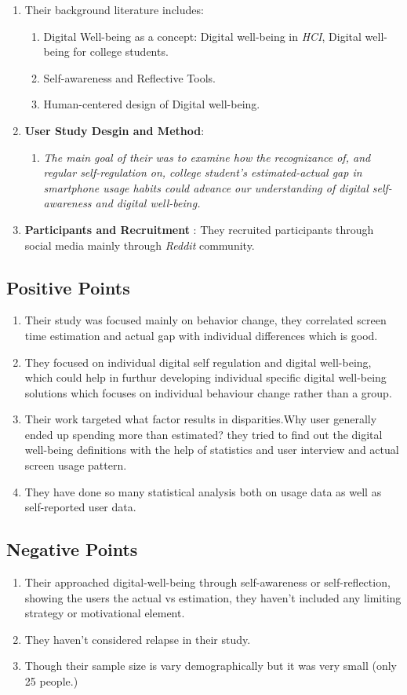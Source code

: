 \documentclass[12pt]{article}
\begin{document}
\begin{enumerate}
    \item Their background literature includes: 
    \begin{enumerate}
        \item Digital Well-being as a concept: Digital well-being in \textit{HCI}, Digital well-being for college students.
        \item Self-awareness and Reflective Tools.
        \item Human-centered design of Digital well-being.
    \end{enumerate}
    \item \textbf{User Study Desgin and Method}:
    \begin{enumerate}
        \item \textit{The main goal of their was to examine how the recognizance of, and regular self-regulation on, college student's  estimated-actual gap in smartphone usage habits could advance our understanding of digital self-awareness and digital well-being.}
    \end{enumerate}
    \item \textbf{Participants and Recruitment} : They recruited participants through social media mainly through \textit{Reddit} community.
  \end{enumerate}

\subsection{Positive Points}
\begin{enumerate}
    \item Their study was focused mainly on behavior change,  they correlated screen time estimation and actual gap with individual differences which is good.
    \item They focused on individual digital self regulation and digital well-being, which could help in furthur developing individual specific digital well-being solutions which focuses on individual behaviour change rather than a group.
    \item Their work targeted what factor results in disparities.Why user generally ended up spending more than estimated? they tried to find out the digital well-being definitions with the help of statistics and user interview and actual screen usage pattern.
    \item They have done so many statistical analysis both on usage data as well as self-reported user data.
\end{enumerate}
\subsection{Negative Points}
\begin{enumerate}
    \item Their approached digital-well-being through self-awareness or self-reflection, showing the users the actual vs estimation, they haven't included any limiting strategy or motivational element.
    \item They haven't considered relapse in their study.
    \item Though their sample size is vary demographically but it was very small (only 25 people.)
\end{enumerate}
\end{document}
